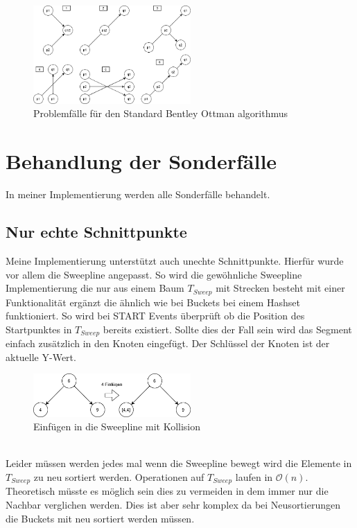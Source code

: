 \documentclass[conference]{IEEEtran}
\begin{document}
	\begin{figure}[h]
		\begin{center}
			\includegraphics[width=6cm]{ProblemFaelle.png}
			\caption{Problemfälle für den Standard Bentley Ottman algorithmus}
			\label{figure_3}
		\end{center}
	\end{figure}



	\section{Behandlung der Sonderfälle}
	In meiner Implementierung werden alle Sonderfälle behandelt.
	\subsection{Nur echte Schnittpunkte}
	Meine Implementierung unterstützt auch unechte Schnittpunkte. Hierfür wurde vor allem die Sweepline angepasst. So wird die gewöhnliche Sweepline Implementierung die nur aus einem Baum $T_{Sweep}$ mit Strecken besteht mit einer Funktionalität ergänzt die ähnlich wie bei Buckets bei einem Hashset funktioniert. So wird bei START Events überprüft ob die Position des Startpunktes in $T_{Sweep}$ bereits existiert. Sollte dies der Fall sein wird das Segment einfach zusätzlich in den Knoten eingefügt. Der Schlüssel der Knoten ist der aktuelle Y-Wert.\\
	\begin{figure}[h!]
		\begin{center}
			\includegraphics[width=6cm]{BaumKollision.png}
			\caption{Einfügen in die Sweepline mit Kollision}
			\label{figure_collision}
		\end{center}
	\end{figure}\\
	Leider müssen werden jedes mal wenn die Sweepline bewegt wird die Elemente in $T_{Sweep}$ zu neu sortiert werden. Operationen auf $T_{Sweep}$ laufen in $\mathcal{O}(n)$. Theoretisch müsste es möglich sein dies zu vermeiden in dem immer nur die Nachbar verglichen werden. Dies ist aber sehr komplex da bei Neusortierungen die Buckets mit neu sortiert werden müssen.
	
\end{document}
